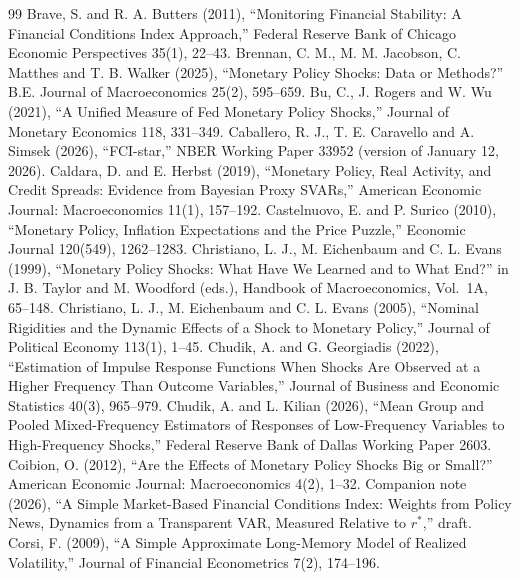 \documentclass[11pt]{article}
\begin{document}
\begin{thebibliography}{99}
 Brave, S. and R. A. Butters (2011), ``Monitoring Financial Stability: A Financial Conditions Index Approach,'' Federal Reserve Bank of Chicago Economic Perspectives 35(1), 22--43.
 Brennan, C. M., M. M. Jacobson, C. Matthes and T. B. Walker (2025), ``Monetary Policy Shocks: Data or Methods?'' B.E. Journal of Macroeconomics 25(2), 595--659.
 Bu, C., J. Rogers and W. Wu (2021), ``A Unified Measure of Fed Monetary Policy Shocks,'' Journal of Monetary Economics 118, 331--349.
 Caballero, R. J., T. E. Caravello and A. Simsek (2026), ``FCI-star,'' NBER Working Paper 33952 (version of January 12, 2026).
 Caldara, D. and E. Herbst (2019), ``Monetary Policy, Real Activity, and Credit Spreads: Evidence from Bayesian Proxy SVARs,'' American Economic Journal: Macroeconomics 11(1), 157--192.
 Castelnuovo, E. and P. Surico (2010), ``Monetary Policy, Inflation Expectations and the Price Puzzle,'' Economic Journal 120(549), 1262--1283.
 Christiano, L. J., M. Eichenbaum and C. L. Evans (1999), ``Monetary Policy Shocks: What Have We Learned and to What End?'' in J. B. Taylor and M. Woodford (eds.), Handbook of Macroeconomics, Vol.\ 1A, 65--148.
 Christiano, L. J., M. Eichenbaum and C. L. Evans (2005), ``Nominal Rigidities and the Dynamic Effects of a Shock to Monetary Policy,'' Journal of Political Economy 113(1), 1--45.
 Chudik, A. and G. Georgiadis (2022), ``Estimation of Impulse Response Functions When Shocks Are Observed at a Higher Frequency Than Outcome Variables,'' Journal of Business and Economic Statistics 40(3), 965--979.
 Chudik, A. and L. Kilian (2026), ``Mean Group and Pooled Mixed-Frequency Estimators of Responses of Low-Frequency Variables to High-Frequency Shocks,'' Federal Reserve Bank of Dallas Working Paper 2603.
 Coibion, O. (2012), ``Are the Effects of Monetary Policy Shocks Big or Small?'' American Economic Journal: Macroeconomics 4(2), 1--32.
 Companion note (2026), ``A Simple Market-Based Financial Conditions Index: Weights from Policy News, Dynamics from a Transparent VAR, Measured Relative to $r^*$,'' draft.
 Corsi, F. (2009), ``A Simple Approximate Long-Memory Model of Realized Volatility,'' Journal of Financial Econometrics 7(2), 174--196.

\end{thebibliography}
\end{document}
